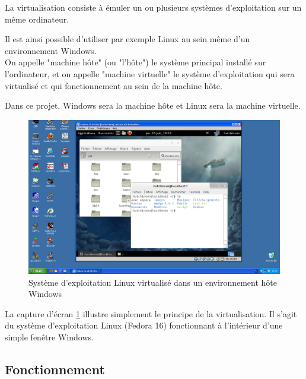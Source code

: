 La virtualisation consiste à émuler un ou plusieurs systèmes d'exploitation sur un même ordinateur.

Il est ainsi possible d'utiliser par exemple Linux au sein même d'un environnement Windows.
\\


On appelle "machine hôte" (ou "l'hôte") le système principal installé sur l'ordinateur, et on appelle "machine virtuelle" le système d'exploitation qui sera virtualisé et qui fonctionnement au sein de la machine hôte.

Dans ce projet, Windows sera la machine hôte et Linux sera la machine virtuelle.
\\


\begin{figure}[!h]
	\center
	\includegraphics[scale=0.35]{images/Virtualisation.png}
	\caption{Système d'exploitation Linux virtualisé dans un environnement hôte Windows}
	\label{Screenshot Virtualisation}
\end{figure}

La capture d'écran \ref{Screenshot Virtualisation} illustre simplement le principe de la virtualisation.
Il s'agit du système d'exploitation Linux (Fedora 16) fonctionnant à l'intérieur d'une simple fenêtre Windows.
\\





\subsection{Fonctionnement}

